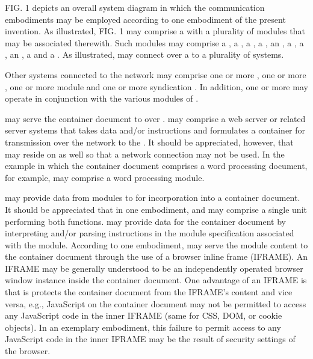 FIG. 1 depicts an overall system
diagram in which the communication embodiments may be employed
according to one embodiment of the present invention. As illustrated,
FIG. 1 may comprise a \hostserversystem{} with a plurality of
modules that may be associated therewith. Such modules may comprise a
\containerserver{}, a \moduleserver{}, a \specificationserver{}, a 
\backendserver{}, an \analysismodule, a \modulecreationserver{}, a \syndicationserver, 
an \advertisementserver, a \geocodeserver{} and a \mapserver{}. As illustrated, \personalizedcontainerserver{} may connect over
a \network{} to a plurality of systems.



Other systems connected
to the network may comprise one or more \usersystems{}, one or
more \remotesourcesystems, one or more module \developersystems{} and one or more syndication \recipientservers{}. In addition, one or more \databasesystems{} may
operate in conjunction with the various modules of \hostserversystem{}.



\Containerserver{} may
serve the container document to \usersystems{} over \network. \Containerserver{} may comprise a web server or
related server systems that takes data and/or instructions and
formulates a container for transmission over the network to the \usersystem. 
It should be appreciated, however, that 
\containerserver{} may reside on \usersystem{} as well so that a
network connection may not be used. In the example in which the
container document comprises a word processing document, for example,
\containerserver{} may comprise a word processing module.


\Moduleserver{} may provide data from
modules to \containerserver{} for incorporation into a
container document. It should be appreciated that in one embodiment,
\containerserver{} and \moduleserver{} may comprise a
single unit performing both functions. \moduleserver{} may
provide data for the container document by interpreting and/or parsing
instructions in the module specification associated with the
module. According to one embodiment, \moduleserver{} may serve
the module content to the container document through the use of a
browser inline frame (IFRAME). An IFRAME may be generally understood
to be an independently operated browser window instance inside the
container document. One advantage of an IFRAME is that is protects the
container document from the IFRAME's content and vice versa, e.g.,
JavaScript on the container document may not be permitted to access
any JavaScript code in the inner IFRAME (same for CSS, DOM, or cookie
objects). In an exemplary embodiment, this failure to permit access to
any JavaScript code in the inner IFRAME may be the result of security
settings of the browser.



